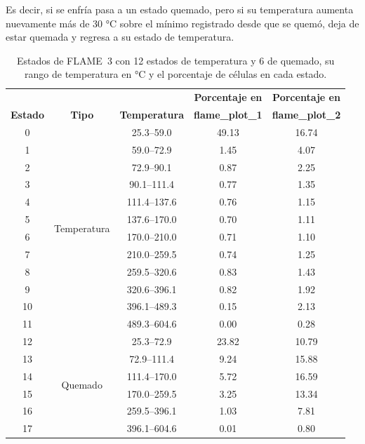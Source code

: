 \begin{enumerate}
	 Es decir, si se enfría pasa a un estado quemado, pero si su temperatura aumenta nuevamente más de 30 °C sobre el mínimo registrado desde que se quemó, deja de estar quemada y regresa a su estado de temperatura.
	 
\end{enumerate}

\begin{table}[htbp]
	\centering
	\footnotesize
	\begin{tabular}{ccccc}
		\toprule
		& & & \textbf{Porcentaje en} & \textbf{Porcentaje en} \\
		\textbf{Estado} & \textbf{Tipo} & \textbf{Temperatura} & \textbf{flame\_plot\_1} & \textbf{flame\_plot\_2} \\ \midrule
		0 & \multirow{12}{*}{Temperatura} & 25.3--59.0 & 49.13 & 16.74 \\
		1 &  & 59.0--72.9 & 1.45 & 4.07 \\
		2 &  & 72.9--90.1 & 0.87 & 2.25 \\
		3 &  & 90.1--111.4 & 0.77 & 1.35 \\
		4 &  & 111.4--137.6 & 0.76 & 1.15 \\
		5 &  & 137.6--170.0 & 0.70 & 1.11 \\
		6 &  & 170.0--210.0 & 0.71 & 1.10 \\
		7 &  & 210.0--259.5 & 0.74 & 1.25 \\
		8 &  & 259.5--320.6 & 0.83 & 1.43 \\
		9 &  & 320.6--396.1 & 0.82 & 1.92 \\
		10 &  & 396.1--489.3 & 0.15 & 2.13 \\
		11 &  & 489.3--604.6 & 0.00 & 0.28 \\ \midrule
		12 & \multirow{6}{*}{Quemado} & 25.3--72.9 & 23.82 & 10.79 \\
		13 &  & 72.9--111.4 & 9.24 & 15.88 \\
		14 &  & 111.4--170.0 & 5.72 & 16.59 \\
		15 &  & 170.0--259.5 & 3.25 & 13.34 \\
		16 &  & 259.5--396.1 & 1.03 & 7.81 \\
		17 &  & 396.1--604.6 & 0.01 & 0.80 \\ \bottomrule
	\end{tabular}
	\caption{Estados de FLAME~3 con 12 estados de temperatura y 6 de quemado, su rango de temperatura en °C y el porcentaje de células en cada estado.}
	\label{tab:flame_states_proportion}
\end{table}


